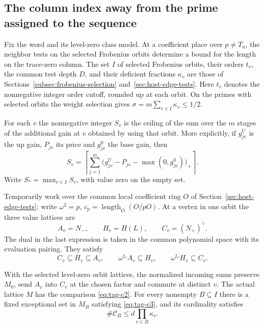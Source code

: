 \subsection{The column index away from the prime assigned to the sequence}
\label{subsec:column-orbit-length}

Fix the word and its level-zero class model. At a coefficient place over \(p\ne T_u\), the neighbor tests on the selected Frobenius orbits determine a bound for the length on the trace-zero column.
The set \(I\) of selected Frobenius orbits, their orders \(t_v\), the
common test depth \(D\), and their deficient fractions \(\kappa_v\)
are those of Sections~\ref{subsec:frobenius-selection}
and~\ref{sec:host-edge-tests}. Here \(t_v\) denotes the nonnegative
integer order cutoff, rounded up at each orbit. On the primes with selected orbits
the weight selection gives \(\sigma=m\sum_{v\in I}\kappa_v\le1/2\).

For each \(v\) the nonnegative integer \(S_v\) is the ceiling of the
sum over the \(m\) stages of the additional gain at \(v\) obtained
by using that orbit. More explicitly, if \(g^U_{jv}\) is the up
gain, \(P_{jv}\) its price and \(g^0_{jv}\) the base gain, then
\[
 S_v=\left\lceil\sum_{j=1}^m
       \big(g^U_{jv}-P_{jv}-\max(0,g^0_{jv})\big)_+\right\rceil .
\]
Write \(S_*=\max_{v\in I}S_v\), with value zero on the empty set.

Temporarily work over the common local coefficient ring \(O\) of
Section~\ref{sec:host-edge-tests}; write \(\omega^2=p\),
\(c_p=\operatorname{length}_O(O/pO)\).
At a vertex in one orbit the three value lattices are
\[
 A_v=N_-,\qquad H_v=H(L),\qquad C_v=(N_+)^\vee.
\]
The dual in the last expression is taken in the common polynomial
space with its evaluation pairing. They satisfy
\[
 C_v\subseteq H_v\subseteq A_v,\qquad
 \omega^{t_v}A_v\subseteq H_v,\qquad
 \omega^{t_v}H_v\subseteq C_v .
 \tag{C1}\label{eq:tag-c1}
\]
\begin{proposition}\label{prop:orbit-value-lattice-neighbors}
With the selected level-zero orbit lattices, the normalized
incoming sums preserve \(M_0\), send \(A_v\) into \(C_v\) at
the chosen factor and commute at distinct \(v\). The actual
lattice \(M\) has the comparison \textup{\eqref{eq:tag-c2}}. For every
nonempty \(B\subseteq I\) there is a fixed exceptional set in
\(M_B\) satisfying \textup{\eqref{eq:tag-c3}}, and its cardinality satisfies
\[
 \#\mathcal C_B\le d\prod_{v\in B}\kappa_v.
\]

\end{proposition}

